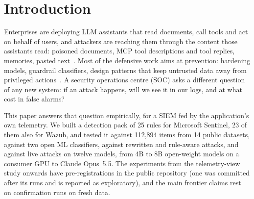 \section{Introduction}
\label{sec:intro}

Enterprises are deploying LLM assistants that read documents, call tools and act on behalf of users,
and attackers are reaching them through the content those assistants read: poisoned documents, MCP
tool descriptions and tool replies, memories, pasted text~\cite{greshake,echoleak,invariant-tp}. Most
of the defensive work aims at prevention: hardening models, guardrail classifiers, design patterns
that keep untrusted data away from privileged actions~\cite{camel,design-patterns}. A security
operations centre (SOC) asks a different question of any new system: if an attack happens, will we
see it in our logs, and at what cost in false alarms?

This paper answers that question empirically, for a SIEM fed by the application's own telemetry. We
built a detection pack of 25 rules for Microsoft Sentinel, 23 of them also for Wazuh, and tested it against 112{,}894
items from 14 public datasets, against two open ML classifiers, against rewritten and rule-aware
attacks, and against live attacks on twelve models, from 4B to 8B open-weight models on a consumer GPU to
Claude Opus~5.5. The experiments from the telemetry-view study onwards have pre-registrations in the
public repository (one was committed after its runs and is reported as exploratory), and the
main frontier claims rest on confirmation runs on fresh data.

